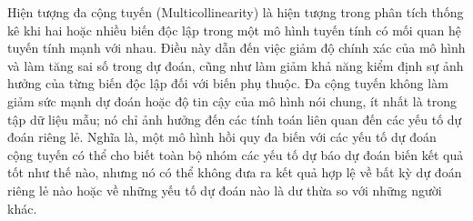 \documentclass[]{article}
\begin{document}
Hiện tượng đa cộng tuyến (Multicollinearity) là hiện tượng trong phân tích thống kê khi hai hoặc nhiều biến độc lập trong một mô hình tuyến tính có mối quan hệ tuyến tính mạnh với nhau. Điều này dẫn đến việc giảm độ chính xác của mô hình và làm tăng sai số trong dự đoán, cũng như làm giảm khả năng kiểm định sự ảnh hưởng của từng biến độc lập đối với biến phụ thuộc. Đa cộng tuyến không làm giảm sức mạnh dự đoán hoặc độ tin cậy của mô hình nói chung, ít nhất là trong tập dữ liệu mẫu; nó chỉ ảnh hưởng đến các tính toán liên quan đến các yếu tố dự đoán riêng lẻ. Nghĩa là, một mô hình hồi quy đa biến với các yếu tố dự đoán cộng tuyến có thể cho biết toàn bộ nhóm các yếu tố dự báo dự đoán biến kết quả tốt như thế nào, nhưng nó có thể không đưa ra kết quả hợp lệ về bất kỳ dự đoán riêng lẻ nào hoặc về những yếu tố dự đoán nào là dư thừa so với những người khác. \cite{multicollinearity}

\newpage
\printbibliography[heading=mybibintoc]
\end{document}
